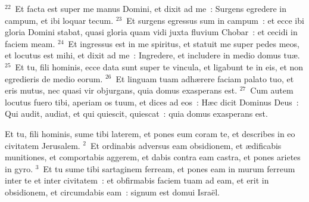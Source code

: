 ${}^{22}$~Et facta est super me manus Domini, et dixit ad me~: Surgens egredere in campum, et ibi loquar tecum.
${}^{23}$~Et surgens egressus sum in campum~: et ecce ibi gloria Domini stabat, quasi gloria quam vidi juxta fluvium Chobar~: et cecidi in faciem meam.
${}^{24}$~Et ingressus est in me spiritus, et statuit me super pedes meos, et locutus est mihi, et dixit ad me~: Ingredere, et includere in medio domus tu\ae .
${}^{25}$~Et tu, fili hominis, ecce data sunt super te vincula, et ligabunt te in eis, et non egredieris de medio eorum.
${}^{26}$~Et linguam tuam adh\ae rere faciam palato tuo, et eris mutus, nec quasi vir objurgans, quia domus exasperans est.
${}^{27}$~Cum autem locutus fuero tibi, aperiam os tuum, et dices ad eos~: H\ae c dicit Dominus Deus~: Qui audit, audiat, et qui quiescit, quiescat~: quia domus exasperans est.

\lettrine[lines=10,image=true,loversize=0.05,lraise=-0.03]{E}{}t tu, fili hominis, sume tibi laterem, et pones eum coram te, et describes in eo civitatem Jerusalem.
${}^{2}$~Et ordinabis adversus eam obsidionem, et \ae dificabis munitiones, et comportabis aggerem, et dabis contra eam castra, et pones arietes in gyro.
${}^{3}$~Et tu sume tibi sartaginem ferream, et pones eam in murum ferreum inter te et inter civitatem~: et obfirmabis faciem tuam ad eam, et erit in obsidionem, et circumdabis eam~: signum est domui Isra\"el.


